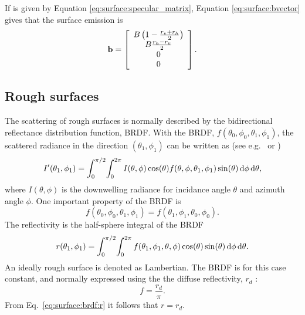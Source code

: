 If  is given by Equation \ref{eq:surface:specular_matrix},
Equation \ref{eq:surface:bvector} gives that the surface emission  is
\begin{equation}
  \label{eq:surface:specular_emission}
   \mathbf{b} = \left[\begin{array}{c}
     B\left(1-\frac{r_v+r_h}{2}\right) \\
     B\frac{r_h-r_v}{2} \\
     0\\0
   \end{array}\right].
\end{equation}


\subsection{Rough surfaces}
The scattering of rough surfaces is normally described by the bidirectional
reflectance distribution function, BRDF. With the BRDF,
$f(\theta_0,\phi_0,\theta_1,\phi_1)$, the scattered radiance in the
direction $(\theta_1,\phi_1)$ can be written as (see e.g.\ 
\citet{rees:01} or \citet{petty:06})
\begin{equation}
  \label{eq:surface:brdf1}
  I'(\theta_1,\phi_1) = \int_0^{\pi/2} \! \int_0^{2\pi} I(\theta,\phi) 
  \cos(\theta) f(\theta,\phi,\theta_1,\phi_1)
  \sin(\theta) \, \mathrm{d}\phi \, \mathrm{d}\theta,
\end{equation}
where $I(\theta,\phi)$ is the downwelling radiance for incidance angle $\theta$
and azimuth angle $\phi$. One important property of the BRDF is
\begin{equation}
  f(\theta_0,\phi_0,\theta_1,\phi_1) = f(\theta_1,\phi_1,\theta_0,\phi_0).
\end{equation}
The reflectivity is the half-sphere integral of the BRDF
\begin{equation}
  \label{eq:surface:brdf:r}
  r(\theta_1,\phi_1) = \int_0^{\pi/2} \! \int_0^{2\pi} 
  f(\theta_1,\phi_1,\theta,\phi) \cos(\theta)
  \sin(\theta) \, \mathrm{d}\phi \, \mathrm{d}\theta.
\end{equation}
An ideally rough surface is denoted as Lambertian. The BRDF is for this case
constant, and normally expressed using the the diffuse reflectivity, $r_d$ 
 \citep[e.g.][]{petty:06}:
\begin{equation}
  \label{eq:surface:lambertian1}
  f = \frac{r_d}{\pi}.
\end{equation}
From Eq.~\ref{eq:surface:brdf:r} it follows that $r = r_d$.





  
